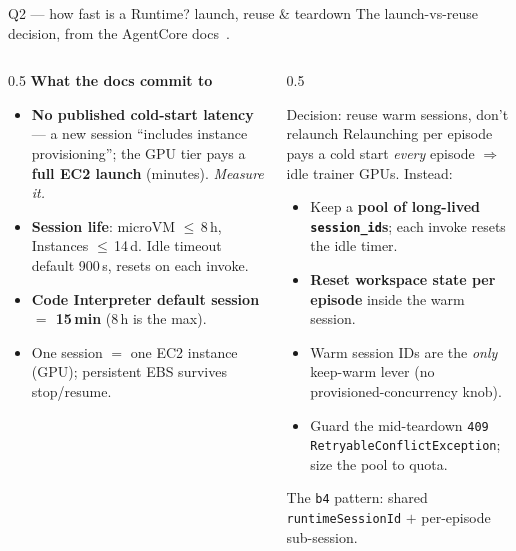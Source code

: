 \documentclass[aspectratio=169]{beamer}
\begin{document}
\begin{frame}{Q2 --- how fast is a Runtime? launch, reuse \& teardown}
  \footnotesize The launch-vs-reuse decision, from the AgentCore docs~\cite{ac-howitworks,ac-instances}.
  \begin{columns}[T]
    \begin{column}{0.5\textwidth}
      \textbf{What the docs commit to}
      \begin{itemize}\scriptsize\setlength\itemsep{0.12em}
        \item \textbf{No published cold-start latency} --- a new session ``includes instance
          provisioning''; the GPU tier pays a \textbf{full EC2 launch} (minutes). \emph{Measure it.}
        \item \textbf{Session life}: microVM $\le$\,8\,h, Instances $\le$\,14\,d. Idle timeout default
          900\,s, resets on each invoke.
        \item \textbf{Code Interpreter default session $=$ 15\,min} (8\,h is the max).
        \item One session $=$ one EC2 instance (GPU); persistent EBS survives stop/resume.
      \end{itemize}
    \end{column}
    \begin{column}{0.5\textwidth}
      \begin{block}{Decision: reuse warm sessions, don't relaunch}
        \scriptsize Relaunching per episode pays a cold start \emph{every} episode $\Rightarrow$ idle
        trainer GPUs. Instead:
        \begin{itemize}\setlength\itemsep{0.06em}
          \item Keep a \textbf{pool of long-lived \texttt{session\_id}s}; each invoke resets the idle timer.
          \item \textbf{Reset workspace state per episode} inside the warm session.
          \item Warm session IDs are the \emph{only} keep-warm lever (no provisioned-concurrency knob).
          \item Guard the mid-teardown \texttt{409 RetryableConflictException}; size the pool to quota.
        \end{itemize}
      \end{block}
      {\scriptsize The \texttt{b4} pattern: shared \texttt{runtimeSessionId} $+$ per-episode sub-session.}
    \end{column}
  \end{columns}
\end{frame}
\end{document}
